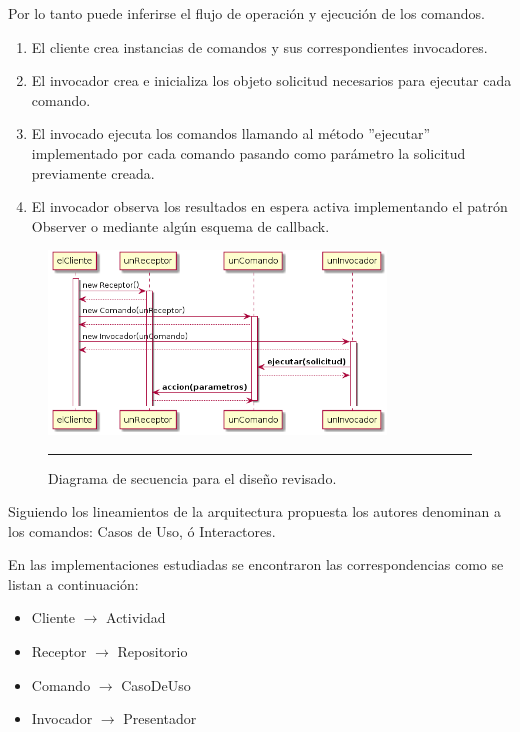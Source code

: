 Por lo tanto puede inferirse el flujo de operación y ejecución de los comandos.

\begin{enumerate}
\item El cliente crea instancias de comandos y sus correspondientes invocadores. 
\item El invocador crea e inicializa los objeto solicitud necesarios para ejecutar cada comando.
\item El invocado ejecuta los comandos llamando al método ''ejecutar'' implementado por cada comando pasando como parámetro la solicitud previamente creada.
\item El invocador observa los resultados en espera activa implementando el patrón Observer o mediante algún esquema de callback.
\end{enumerate}

\begin{figure}[htbp]
	\centering
	\includegraphics[width=0.8\textwidth]{Figures/uml_sequence_commander_req_resp.png}
	\rule{35em}{1pt}
	\caption[Commander Review]{Diagrama de secuencia para el diseño revisado.}
	\label{fig:uml_commander_sequence_req_resp}
\end{figure}

Siguiendo los lineamientos de la arquitectura propuesta los autores denominan a los comandos: Casos de Uso, ó Interactores.

En las implementaciones estudiadas se encontraron las correspondencias como se listan a continuación:
\begin{itemize}
	\item Cliente $\rightarrow$ Actividad
	\item Receptor $\rightarrow$ Repositorio
	\item Comando $\rightarrow$ CasoDeUso
	\item Invocador $\rightarrow$ Presentador
\end{itemize}

